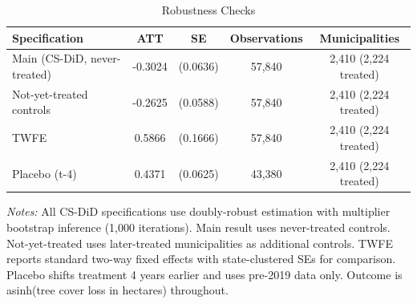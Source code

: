 \begin{table}[htbp]
\centering
\caption{Robustness Checks}
\label{tab:robustness}
\begin{tabular}{lcccc}
\toprule
Specification & ATT & SE & Observations & Municipalities \\
\midrule
Main (CS-DiD, never-treated) & -0.3024 & (0.0636) & 57,840 & 2,410 (2,224 treated) \\
Not-yet-treated controls & -0.2625 & (0.0588) & 57,840 & 2,410 (2,224 treated) \\
TWFE & 0.5866 & (0.1666) & 57,840 & 2,410 (2,224 treated) \\
Placebo (t-4) & 0.4371 & (0.0625) & 43,380 & 2,410 (2,224 treated) \\
\bottomrule
\end{tabular}
\begin{tablenotes}[flushleft]
\small
\item \textit{Notes:} All CS-DiD specifications use doubly-robust estimation with multiplier bootstrap inference (1,000 iterations). Main result uses never-treated controls. Not-yet-treated uses later-treated municipalities as additional controls. TWFE reports standard two-way fixed effects with state-clustered SEs for comparison. Placebo shifts treatment 4 years earlier and uses pre-2019 data only. Outcome is asinh(tree cover loss in hectares) throughout.
\end{tablenotes}
\end{table}
